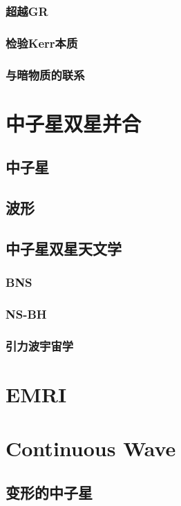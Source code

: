 \subsubsection{超越GR}
\subsubsection{检验Kerr本质}
\subsubsection{与暗物质的联系}
\section{中子星双星并合}
\subsection{中子星}
\subsection{波形}
\subsection{中子星双星天文学}
\subsubsection{BNS}
\subsubsection{NS-BH}
\subsubsection{引力波宇宙学}
\section{EMRI}
\section{Continuous Wave}
\subsection{变形的中子星}
